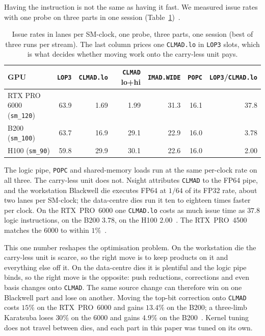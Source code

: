 Having the instruction is not the same as having it fast. We measured
issue rates with one probe on three parts in one session
(Table~\ref{tab:clmad-dies})~.

\begin{table}[t]
\centering
\small
\caption{Issue rates in lanes per SM-clock, one probe, three parts, one
  session (best of three runs per stream). The last column prices one
  \texttt{CLMAD.lo} in \texttt{LOP3} slots, which is what decides
  whether moving work onto the carry-less unit pays.}
\label{tab:clmad-dies}
\begin{tabular}{@{}lrrrrrr@{}}
\toprule
GPU & \texttt{LOP3} & \texttt{CLMAD.lo} & \texttt{CLMAD} lo+hi & \texttt{IMAD.WIDE} & \texttt{POPC} & \texttt{LOP3}/\texttt{CLMAD.lo} \\
\midrule
RTX PRO 6000 (\texttt{sm\_120}) & 63.9 & 1.69 & 1.99 & 31.3 & 16.1 & 37.8 \\
B200 (\texttt{sm\_100}) & 63.7 & 16.9 & 29.1 & 22.9 & 16.0 & 3.78 \\
H100 (\texttt{sm\_90}) & 59.8 & 29.9 & 30.1 & 22.6 & 16.0 & 2.00 \\
\bottomrule
\end{tabular}
\end{table}

The logic pipe, \texttt{POPC} and shared-memory loads run at the same
per-clock rate on all three. The carry-less unit does not. Nsight
attributes \texttt{CLMAD} to the FP64 pipe, and the workstation
Blackwell die executes FP64 at $1/64$ of its FP32 rate, about two lanes
per SM-clock; the data-centre dies run it ten to eighteen times faster
per clock. On the RTX~PRO~6000 one \texttt{CLMAD.lo} costs as much issue
time as $37.8$ logic instructions, on the B200 $3.78$, on the H100
$2.00$~. The RTX~PRO~4500 matches the
6000 to within $1\%$~.

This one number reshapes the optimisation problem. On the workstation
die the carry-less unit is scarce, so the right move is to keep
products on it and everything else off it. On the data-centre dies it
is plentiful and the logic pipe binds, so the right move is the
opposite: push reductions, corrections and even basis changes onto
\texttt{CLMAD}. The same source change can therefore win on one
Blackwell part and lose on another. Moving the top-bit correction onto
\texttt{CLMAD} costs $15\%$ on the RTX~PRO~6000 and gains $13.4\%$ on the
B200; a three-limb Karatsuba loses $30\%$ on the 6000 and gains $4.9\%$
on the B200~.
Kernel tuning does not travel between dies, and each part in this
paper was tuned on its own.

